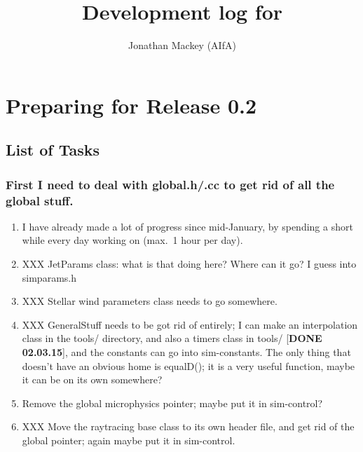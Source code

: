 \documentclass[a4paper,11pt]{article}
\title{Development log for \pion{}}
\author{Jonathan Mackey (AIfA)}
\begin{document}
\maketitle


\section{Preparing for Release 0.2}

\subsection{List of Tasks}

\subsubsection{First I need to deal with global.h/.cc to get rid of all the global stuff.}
\begin{enumerate}
\item I have already made a lot of progress since mid-January, by spending a short while every day working on \pion{} (max.~1 hour per day).
\item XXX JetParams class: what is that doing here?  Where can it go?  I guess into simparams.h
\item XXX Stellar wind parameters class needs to go somewhere.
\item XXX GeneralStuff needs to be got rid of entirely; I can make an interpolation class in the tools/ directory, and also a timers class in tools/ [\textbf{DONE 02.03.15}], and the constants can go into sim-constants.
  The only thing that doesn't have an obvious home is equalD(); it is a very useful function, maybe it can be on its own somewhere?
\item Remove the global microphysics pointer; maybe put it in sim-control?
\item XXX Move the raytracing base class to its own header file, and get rid of the global pointer; again maybe put it in sim-control.
\end{enumerate}
\end{document}
